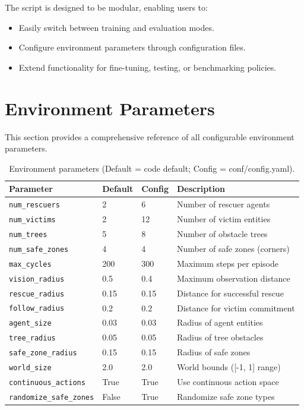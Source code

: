 \documentclass[11pt,a4paper]{article}
\begin{document}
The script is designed to be modular, enabling users to:
\begin{itemize}
    \item Easily switch between training and evaluation modes.
    \item Configure environment parameters through configuration files.
    \item Extend functionality for fine-tuning, testing, or benchmarking policies.
\end{itemize}

\section{Environment Parameters}
\label{sec:parameters}

This section provides a comprehensive reference of all configurable environment parameters.

\begin{table}[H]
\centering
\begin{tabular}{llll}
\toprule
\textbf{Parameter} & \textbf{Default} & \textbf{Config} & \textbf{Description} \\
\midrule
\texttt{num\_rescuers} & 2 & 6 & Number of rescuer agents \\
\texttt{num\_victims} & 2 & 12 & Number of victim entities \\
\texttt{num\_trees} & 5 & 8 & Number of obstacle trees \\
\texttt{num\_safe\_zones} & 4 & 4 & Number of safe zones (corners) \\
\texttt{max\_cycles} & 200 & 300 & Maximum steps per episode \\
\texttt{vision\_radius} & 0.5 & 0.4 & Maximum observation distance \\
\texttt{rescue\_radius} & 0.15 & 0.15 & Distance for successful rescue \\
\texttt{follow\_radius} & 0.2 & 0.2 & Distance for victim commitment \\
\texttt{agent\_size} & 0.03 & 0.03 & Radius of agent entities \\
\texttt{tree\_radius} & 0.05 & 0.05 & Radius of tree obstacles \\
\texttt{safe\_zone\_radius} & 0.15 & 0.15 & Radius of safe zones \\
\texttt{world\_size} & 2.0 & 2.0 & World bounds ([-1, 1] range) \\
\texttt{continuous\_actions} & True & True & Use continuous action space \\
\texttt{randomize\_safe\_zones} & False & True & Randomize safe zone types \\
\bottomrule
\end{tabular}
\caption{Environment parameters (Default = code default; Config = conf/config.yaml).}
\label{tab:env_params}
\end{table}
\end{document}
